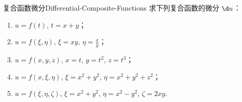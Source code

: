 \begin{problem}{复合函数微分}{Differential-Composite-Functions}
    求下列复合函数的微分 $\d u$：
    \begin{enumerate}
        \item $u = f(t)$, $t = x + y$；
        \item $u = f(\xi, \eta)$, $\xi = xy$, $\eta = \frac{x}{y}$；
        \item $u = f(x, y, z)$, $x = t$, $y = t^2$, $z = t^3$；
        \item $u = f(x, \xi, \eta)$, $\xi = x^2 + y^2$, $\eta = x^2 + y^2 + z^2$；
        \item $u = f(\xi, \eta, \zeta)$, $\xi = x^2 + y^2$, $\eta = x^2 - y^2$, $\zeta = 2xy$.
    \end{enumerate}
\end{problem}

